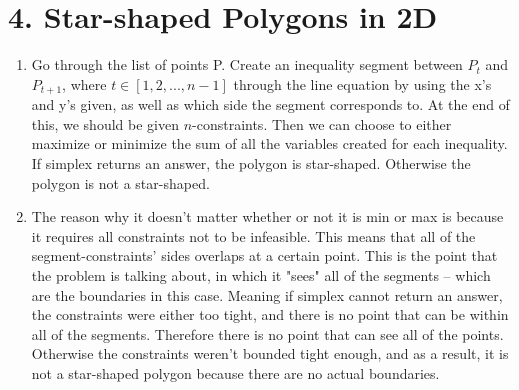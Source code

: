 \documentclass[11pt]{article}
\newenvironment{qparts}{\begin{enumerate}[{(}a{)}]}{\end{enumerate}}
\begin{document}
\section*{4. Star-shaped Polygons in 2D}
\begin{qparts}
\item Go through the list of points P. Create an inequality segment between $P_t$ and $P_{t+1}$, where $ t \in [1, 2, ..., n-1]$ through the line equation by using the x's and y's given, as well as which side the segment corresponds to. At the end of this, we should be given $n$-constraints. Then we can choose to either maximize or minimize the sum of all the variables created for each inequality. If simplex returns an answer, the polygon is star-shaped. Otherwise the polygon is not a star-shaped.
\item The reason why it doesn't matter whether or not it is min or max is because it requires all constraints not to be infeasible. This means that all of the segment-constraints' sides overlaps at a certain point. This is the point that the problem is talking about, in which it "sees" all of the segments -- which are the boundaries in this case. Meaning if simplex cannot return an answer, the constraints were either too tight, and there is no point that can be within all of the segments. Therefore there is no point that can see all of the points. Otherwise the constraints weren't bounded tight enough, and as a result, it is not a star-shaped polygon because there are no actual boundaries. 
\end{qparts}

\newpage
\end{document}
